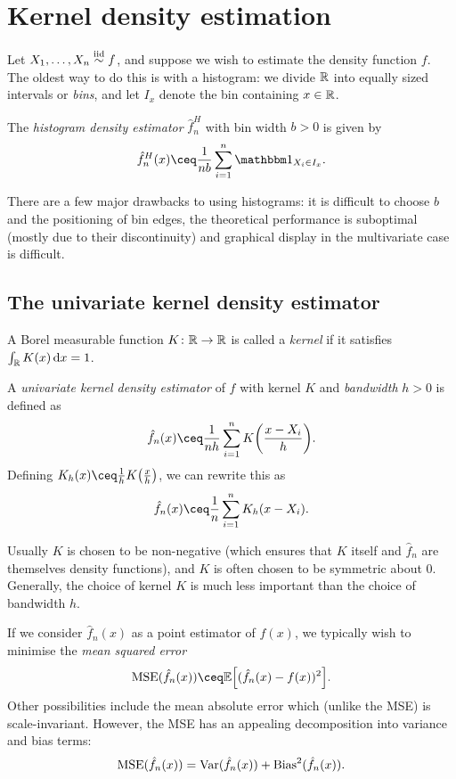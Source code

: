 \section{Kernel density estimation}
Let $X_1, \dotsc, X_n \overset{\mathrm{iid}}{\sim} f$, and suppose we wish to estimate the density function $f$. The oldest way to do this is with a histogram: we divide $\mathbb R$ into equally sized intervals or \emph{bins}, and let $I_x$ denote the bin containing $x \in \mathbb R$.
\begin{definition}
	The \emph{histogram density estimator} $\hat f_n^H$ with bin width $b > 0$ is given by
	\[
	\hat f_n^H(x) \ceq \frac{1}{nb} \sum_{i=1}^n \ind_{X_i \in I_x}.  
	\]
\end{definition}

There are a few major drawbacks to using histograms: it is difficult to choose $b$ and the positioning of bin edges, the theoretical performance is suboptimal (mostly due to their discontinuity) and graphical display in the multivariate case is difficult. 

\subsection{The univariate kernel density estimator}
\begin{definition}
	A Borel measurable function $K \colon \mathbb R \to \mathbb R$ is called a \emph{kernel} if it satisfies $\int_\mathbb R K(x) \dd{x} = 1$. 
	
	A \emph{univariate kernel density estimator} of $f$ with kernel $K$ and \emph{bandwidth} $h > 0$ is defined as
	\[
	\hat f_n(x) \ceq \frac1{nh} \sum_{i=1}^n K\qty(\frac{x - X_i}{h}).
	\]
	Defining $K_h(x) \ceq \frac1h K\qty(\frac xh)$, we can rewrite this as
	\[
	\hat f_n(x) \ceq \frac1n \sum_{i=1}^n K_h(x - X_i). 
	\]
\end{definition}

Usually $K$ is chosen to be non-negative (which ensures that $K$ itself and $\hat f_n$ are themselves density functions), and $K$ is often chosen to be symmetric about 0. Generally, the choice of kernel $K$ is much less important than the choice of bandwidth $h$. 

If we consider $\hat f_n(x)$ as a point estimator of $f(x)$, we typically wish to minimise the \emph{mean squared error}
\[
\MSE(\hat f_n(x)) \ceq \EE\qty[(\hat f_n(x) - f(x))^2]. 
\]
Other possibilities include the mean absolute error which (unlike the MSE) is scale-invariant. However, the MSE has an appealing decomposition into variance and bias terms:
\[
\operatorname{MSE}(\hat f_n(x)) = \operatorname{Var}(\hat f_n(x)) + \operatorname{Bias}^2(\hat f_n(x)). 
\]

